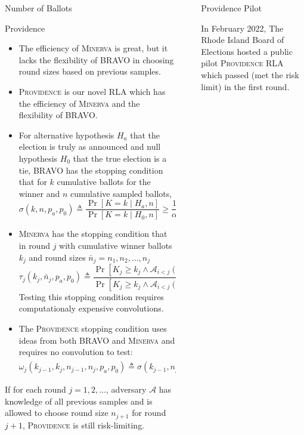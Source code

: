 \documentclass[final]{beamer}
\newcommand{\Minerva}{\textsc{Minerva}\xspace}
\newcommand{\Prov}{\textsc{Providence}\xspace}
\newcommand{\BRAVO}{\textsc{BRAVO}\xspace}
\newlength{\sepwidth}
\newlength{\colwidth}
\newcommand{\separatorcolumn}{\begin{column}{\sepwidth}\end{column}}
\begin{document}
\begin{frame}[t]
\begin{columns}[t]
\begin{column}{\colwidth}
\begin{block}{Number of Ballots}
\end{block}

\begin{block}{Providence}

\begin{itemize}
\item
The efficiency of \Minerva is great, but it lacks the flexibility of \BRAVO in choosing round sizes based on previous samples.
\item
\Prov is our novel RLA which has the efficiency of \Minerva and the flexibility of \BRAVO.
\item For alternative hypothesis $H_a$ that the election is truly as announced and null
hypothesis $H_0$ that the true election is a tie, \BRAVO has the stopping condition that
for $k$ cumulative ballots for the winner and $n$ cumulative sampled ballots,
$$\sigma(k,n,p_a,p_0) \triangleq \frac{\Pr[K=k\mid H_a, n]}{\Pr[K=k\mid H_0, n]}\ge \frac{1}{\alpha}.$$
\item \Minerva has the stopping condition that in round $j$ with cumulative winner ballots $k_j$ and round sizes $\bar n_j = n_1,n_2,\ldots,n_j$
$$\tau_j(k_j,\bar n_j,p_a,p_0) \triangleq \frac{\Pr[K_j\ge k_j \wedge \mathcal{A}_{i<j}(X)\neq Correct \mid H_a, \bar n_j]}{\Pr[K_j\ge k_j \wedge \mathcal{A}_{i<j}(X)\neq Correct \mid H_0, \bar n_j]}\ge \frac{1}{\alpha}.$$ Testing this stopping condition requires computationaly expensive convolutions.
\item The \Prov stopping condition uses ideas from both \BRAVO and \Minerva and requires no convolution to test:
$$\omega_j(k_{j-1},k_j,n_{j-1},n_j,p_a,p_0)\triangleq \sigma(k_{j-1},n_{j-1},p_a,p_0)\cdot \tau_1(k_j,n_j,p_a,p_0) \ge \frac{1}{\alpha}.$$ 
\end{itemize}

If for each round $j=1,2,\ldots$, 
adversary $\mathcal{A}$ has knowledge of all previous samples 
and is allowed to choose round size $n_{j+1}$ for round $j+1$, 
\Prov is still risk-limiting. 


\end{block}

\end{column}

\separatorcolumn

\begin{column}{\colwidth}

\begin{block}{Providence Pilot}

In February 2022, The Rhode Island Board of Elections hosted a public pilot \Prov RLA which 
passed (met the risk limit) in the first round.


\end{block}
\end{column}
\end{columns}
\end{frame}
\end{document}
